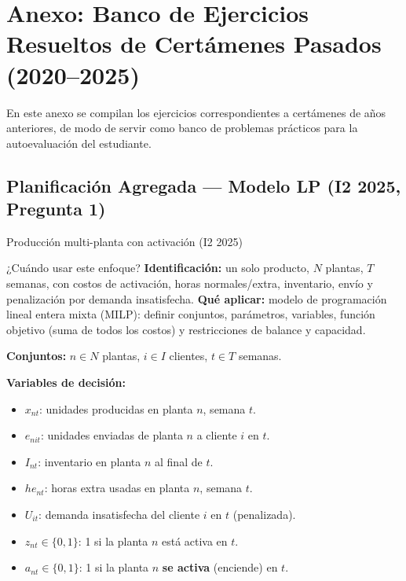 \section{Anexo: Banco de Ejercicios Resueltos de Certámenes Pasados (2020--2025)}

En este anexo se compilan los ejercicios correspondientes a certámenes de años anteriores, de modo de servir como banco de problemas prácticos para la autoevaluación del estudiante.

\subsection[PA: Modelo LP (I2 2025)]{Planificación Agregada --- Modelo LP (I2 2025, Pregunta 1)}

\begin{ejercicio}{Producción multi-planta con activación (I2 2025)}

\begin{tipprueba}{¿Cuándo usar este enfoque?}
\textbf{Identificación:} un solo producto, $N$ plantas, $T$ semanas, con costos de activación, horas normales/extra, inventario, envío y penalización por demanda insatisfecha. \textbf{Qué aplicar:} modelo de programación lineal entera mixta (MILP): definir conjuntos, parámetros, variables, función objetivo (suma de todos los costos) y restricciones de balance y capacidad.
\end{tipprueba}

\textbf{Conjuntos:} $n\in N$ plantas, $i\in I$ clientes, $t\in T$ semanas.

\medskip
\textbf{Variables de decisión:}
\begin{itemize}[leftmargin=1.4em, itemsep=0pt]
  \item $x_{nt}$: unidades producidas en planta $n$, semana $t$.
  \item $e_{nit}$: unidades enviadas de planta $n$ a cliente $i$ en $t$.
  \item $I_{nt}$: inventario en planta $n$ al final de $t$.
  \item $he_{nt}$: horas extra usadas en planta $n$, semana $t$.
  \item $U_{it}$: demanda insatisfecha del cliente $i$ en $t$ (penalizada).
  \item $z_{nt}\in\{0,1\}$: 1 si la planta $n$ está activa en $t$.
  \item $a_{nt}\in\{0,1\}$: 1 si la planta $n$ \textbf{se activa} (enciende) en $t$.
\end{itemize}


\end{ejercicio}

